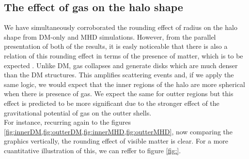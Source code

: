 \subsection{The effect of gas on the halo shape}
We have simultaneously corroborated the rounding effect of radius on the halo shape from DM-only and MHD simulations. However, from the parallel presentation of both of the results, it is easly noticeable that there is also a relation of this rounding effect in terms of the presence of matter, which is to be expected \cite{effect of gas}. Unlike DM, gas collapses and generate disks which are much denser than the DM structures. This amplifies scattering events and, if we apply the same logic, we would expect that the inner regions of the halo are more spherical when there is presence of gas. We expect the same for outter regions but this effect is predicted to be more significant due to the stronger effect of the gravitational potential of gas on the outter shells.\\

For instance, recurring again to the figures \ref{fig:innerDM,fig:outterDM,fig:innerMHD,fig:outterMHD}, now comparing the graphics vertically, the rounding effect of visible matter is clear. For a more cuantitative illustration of this, we can reffer to figure \ref{fig:}. \\


